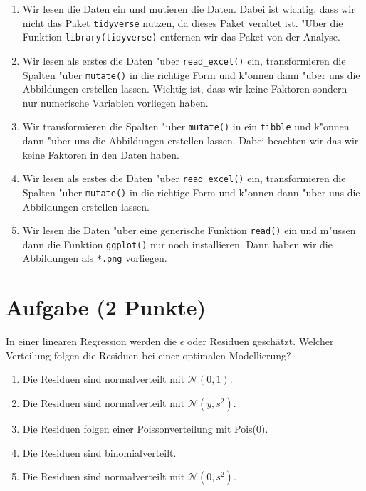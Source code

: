 \documentclass[a4paper, 10pt]{scrartcl}\usepackage[]{graphicx}\usepackage[]{xcolor}
\begin{document}
\begin{enumerate}
\item [\textbf{A} \msquare] Wir lesen die Daten ein und mutieren die Daten. Dabei ist wichtig, dass wir nicht das Paket \texttt{tidyverse} nutzen, da dieses Paket veraltet ist. {"U}ber die Funktion \texttt{library(tidyverse)} entfernen wir das Paket von der Analyse.
\item [\textbf{B} \msquare] Wir lesen als erstes die Daten {"u}ber \texttt{read\_excel()} ein, transformieren die Spalten {"u}ber \texttt{mutate()} in die richtige Form und k{"o}nnen dann  {"u}ber  uns die Abbildungen erstellen lassen. Wichtig ist, dass wir keine Faktoren sondern nur numerische Variablen vorliegen haben.
\item [\textbf{C} \msquare] Wir transformieren die Spalten {"u}ber \texttt{mutate()} in ein \texttt{tibble} und k{"o}nnen dann {"u}ber  uns die Abbildungen erstellen lassen. Dabei beachten wir das wir keine Faktoren in den Daten haben.
\item [\textbf{D} \msquare] Wir lesen als erstes die Daten {"u}ber \texttt{read\_excel()} ein, transformieren die Spalten {"u}ber \texttt{mutate()} in die richtige Form und k{"o}nnen dann {"u}ber  uns die Abbildungen erstellen lassen.
\item [\textbf{E} \msquare] Wir lesen die Daten {"u}ber eine generische Funktion \texttt{read()} ein und m{"u}ssen dann die Funktion \texttt{ggplot()} nur noch installieren. Dann haben wir die Abbildungen als \texttt{*.png} vorliegen.
\end{enumerate}

\section{Aufgabe \hfill (2 Punkte)}

In einer linearen Regression werden die $\epsilon$ oder Residuen
gesch{\"a}tzt. Welcher Verteilung folgen die Residuen bei einer optimalen
Modellierung? 



\begin{enumerate}
\item [\textbf{A} \msquare] Die Residuen sind normalverteilt mit $\mathcal{N}(0, 1)$.
\item [\textbf{B} \msquare] Die Residuen sind normalverteilt mit $\mathcal{N}(\bar{y}, s^2)$.
\item [\textbf{C} \msquare] Die Residuen folgen einer Poissonverteilung mit Pois(0).
\item [\textbf{D} \msquare] Die Residuen sind binomialverteilt.
\item [\textbf{E} \msquare] Die Residuen sind normalverteilt mit $\mathcal{N}(0, s^2)$.
\end{enumerate}
\end{document}
